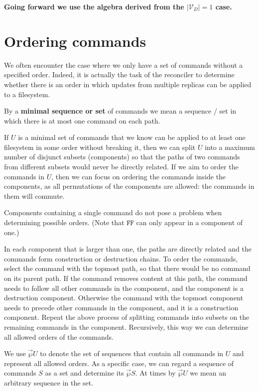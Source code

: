 \documentclass[12pt]{article}
\newcommand{\setvx}[1]{\mathcal{V}_{#1}}
\newcommand{\setd}{\setvx{D}}
\newcommand{\fscommand}[2]{{#1#2}}
\newcommand{\fsregcommandchar}[1]{\mathtt{#1}}
\newcommand{\fsregcommand}[2]{\fscommand{\fsregcommandchar{#1}}{\fsregcommandchar{#2}}}
\newcommand{\cff}{\fsregcommand{F}{F}}
\newcommand{\orderset}[1]{\vec{\wp}{#1}}
\begin{document}
{\bf Going forward we use the algebra derived from the $|\setd|=1$ case.}

\section{Ordering commands}

We often encounter the case where we only have a set of commands without a specified order.
Indeed, it is actually the task of the reconciler to determine whether there is an order
in which updates from multiple replicas can be applied to a filesystem.

By a {\bf minimal sequence or set} of commands we mean a sequence / set in which
there is at most one command on each path.

If $U$ is a minimal set of commands
that we know can be applied to at least one filesystem in some order without breaking it,
then we can split $U$ into a maximum number of disjunct subsets
(components) so that the paths of two commands from different subsets would never be directly related.
If we aim to order the commands in $U$, then we can focus on ordering the commands
inside the components, as all permutations of the components are allowed:
the commands in them will commute.

Components containing a single command do not pose a problem when determining
possible orders.
(Note that $\cff$ can only appear in a component of one.)

In each component that is larger than one, the paths are directly related
and the commands form construction or destruction chains.
To order the commands,
select the command with the topmost path, so that there would be no command
on its parent path. If the command removes content at this path, the command
needs to follow all other commands in the component, and
the component is a destruction component.
Otherwise the command with the topmost component needs to precede other commands
in the component, and it is a construction component.
Repeat the above process of splitting commands into subsets on the remaining commands
in the component. Recursively, this way we can determine all allowed orders of the commands.

We use $\orderset{U}$ to denote the set of sequences that contain all commands in $U$
and represent all allowed orders. As a specific case, we can regard a sequence of commands $S$
as a set and determine its $\orderset{S}$.
At times by $\orderset{U}$ we mean an arbitrary sequence in the set.
\end{document}
